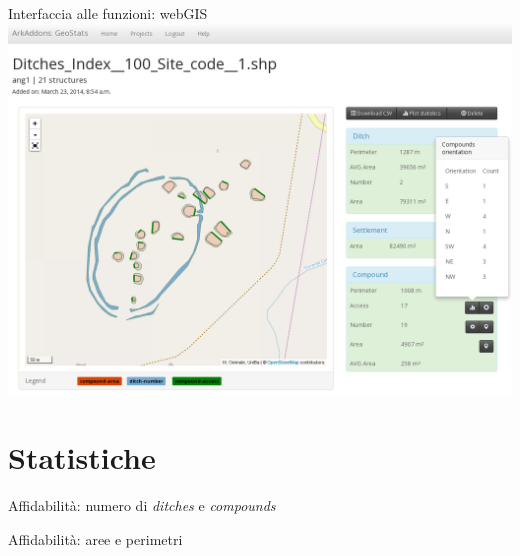 \documentclass[xcolor=svgnames]{beamer}
\begin{document}
        \begin{frame}{Interfaccia alle funzioni: webGIS}
            \includegraphics[width=1\textwidth]{img/shp-detail-5}
        \end{frame}

    \section{Statistiche}

        \begin{frame}{Affidabilità: numero di \emph{ditches} e \emph{compounds}}
            \centering
            \begin{tikzpicture}
                
            \end{tikzpicture}

            \begin{tikzpicture}
                
            \end{tikzpicture}
        \end{frame}

        \begin{frame}{Affidabilità: aree e perimetri}
            \centering
            \begin{tikzpicture}
                
            \end{tikzpicture}

            \begin{tikzpicture}
                
            \end{tikzpicture}
        \end{frame}
\end{document}
